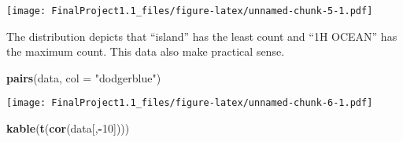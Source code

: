 \documentclass[
]{article}
\newenvironment{Shaded}{\begin{snugshade}}{\end{snugshade}}
\newcommand{\DataTypeTok}[1]{\textcolor[rgb]{0.13,0.29,0.53}{#1}}
\newcommand{\DecValTok}[1]{\textcolor[rgb]{0.00,0.00,0.81}{#1}}
\newcommand{\KeywordTok}[1]{\textcolor[rgb]{0.13,0.29,0.53}{\textbf{#1}}}
\newcommand{\NormalTok}[1]{#1}
\newcommand{\OperatorTok}[1]{\textcolor[rgb]{0.81,0.36,0.00}{\textbf{#1}}}
\newcommand{\StringTok}[1]{\textcolor[rgb]{0.31,0.60,0.02}{#1}}
\begin{document}
\begin{Shaded}
\end{Shaded}

\texttt{[image: FinalProject1.1\_files/figure-latex/unnamed-chunk-5-1.pdf]}

The distribution depicts that ``island'' has the least count and ``1H
OCEAN'' has the maximum count. This data also make practical sense.

\begin{Shaded}
\begin{Highlighting}[]
\KeywordTok{pairs}\NormalTok{(data, }\DataTypeTok{col =} \StringTok{"dodgerblue"}\NormalTok{)}
\end{Highlighting}
\end{Shaded}

\texttt{[image: FinalProject1.1\_files/figure-latex/unnamed-chunk-6-1.pdf]}

\begin{Shaded}
\begin{Highlighting}[]
\KeywordTok{kable}\NormalTok{(}\KeywordTok{t}\NormalTok{(}\KeywordTok{cor}\NormalTok{(data[,}\OperatorTok{-}\DecValTok{10}\NormalTok{])))}
\end{Highlighting}
\end{Shaded}
\end{document}
